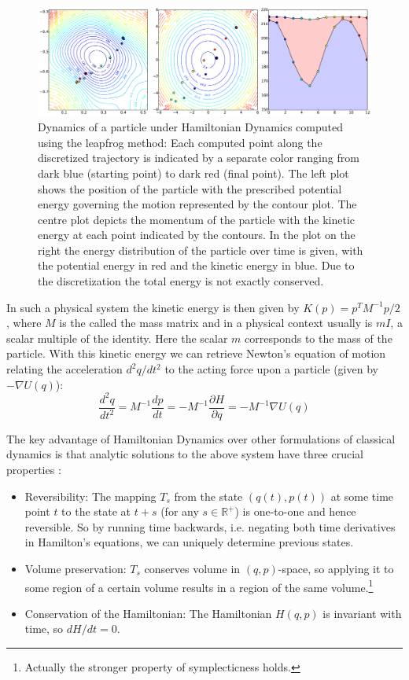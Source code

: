 \begin{figure}
\centering
\includegraphics[width=2.05\columnwidth]{figures/hmc_motion_1hmc_12lf.pdf}
\caption{Dynamics of a particle under Hamiltonian Dynamics computed using the leapfrog method: Each computed point along the discretized trajectory is indicated by a separate color ranging from dark blue (starting point) to dark red (final point). The left plot shows the position of the particle with the prescribed potential energy governing the motion represented by the contour plot. The centre plot depicts the momentum of the particle with the kinetic energy at each point indicated by the contours. In the plot on the right the energy distribution of the particle over time is given, with the potential energy in red and the kinetic energy in blue. Due to the discretization the total energy is not exactly conserved.}
\label{fig:HMC_MOTION_1hmc_12lf}
\end{figure}

In such a physical system the kinetic energy is then given by $K(p) = p^T M^{-1} p /2$, where $M$ is the called the mass matrix and in a physical context usually is $m I$, a scalar multiple of the identity. Here the scalar $m$ corresponds to the mass of the particle. With this kinetic energy we can retrieve Newton's equation of motion relating the acceleration $d^2q/dt^2$ to the acting force upon a particle (given by $-\nabla U(q)$):
\begin{equation} \label{eq:NewtonsEquation}
\frac{d^2q}{dt^2} = M^{-1} \frac{dp}{dt} = - M^{-1} \frac{\partial H}{\partial q} = - M^{-1} \nabla U(q)
\end{equation}

The key advantage of Hamiltonian Dynamics over other formulations of classical dynamics is that analytic solutions to the above system have three crucial properties \parencite{Neal2011}:
\begin{itemize}
\item Reversibility: The mapping $T_s$ from the state $(q(t), p(t))$ at some time point $t$ to the state at $t+s$ (for any $s \in \mathbb{R^+}$) is one-to-one and hence reversible. So by running time backwards, i.e. negating both time derivatives in Hamilton's equations, we can uniquely determine previous states.
\item Volume preservation: $T_s$ conserves volume in $(q, p)$-space, so applying it to some region of a certain volume results in a region of the same volume.\footnote{Actually the stronger property of symplecticness holds.}
\item Conservation of the Hamiltonian: The Hamiltonian $H(q, p)$ is invariant with time, so $dH/dt = 0$.
\end{itemize}

